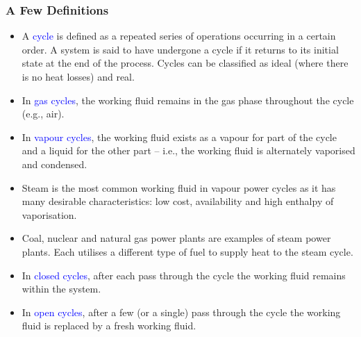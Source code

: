 \documentclass[10pt,compress]{beamer}
\begin{document}
\begin{frame}
 \frametitle{A Few Definitions}
 \begin{itemize}
  \item <1-> A \textcolor{blue}{cycle} is defined as a repeated series of operations occurring in a certain order. A system is said to have undergone a cycle if it returns to its initial state at the end of the process.  Cycles can be classified as ideal (where there is no heat losses) and real. 
  \item <2-> In \textcolor{blue}{gas cycles}, the working fluid remains in the gas phase throughout the cycle (e.g., air).
  \item <3-> In \textcolor{blue}{vapour cycles}, the working fluid exists as a vapour for part of the cycle and a liquid for the other part -- i.e., the working fluid is alternately vaporised and condensed.
  \item <4-> Steam is the most common working fluid in vapour power cycles as it has many desirable characteristics: low cost, availability and high enthalpy of vaporisation.
  \item <5-> Coal, nuclear and natural gas power plants are examples of steam power plants. Each utilises a different type of fuel to supply heat to the steam cycle. 
  \item <6-> In \textcolor{blue}{closed cycles}, after each pass through the cycle the working fluid remains within the system.
  \item <7-> In \textcolor{blue}{open cycles}, after a few (or a single) pass through the cycle the working fluid is replaced by a fresh working fluid.
 \end{itemize}
\end{frame}
\end{document}
